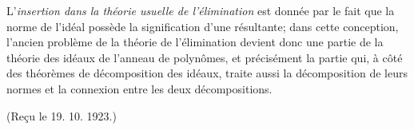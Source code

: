 L'\emph{insertion dans la théorie usuelle de l'élimination} est donnée par le fait que la norme de l'idéal possède la signification d'une résultante; dans cette conception, l'ancien problème de la théorie de l'élimination devient donc une partie de la théorie des idéaux de l'anneau de polynômes, et précisément la partie qui, à côté des théorèmes de décomposition des idéaux, traite aussi la décomposition de leurs normes et la connexion entre les deux décompositions.

\begin{center}
(Reçu le 19. 10. 1923.)
\end{center}
